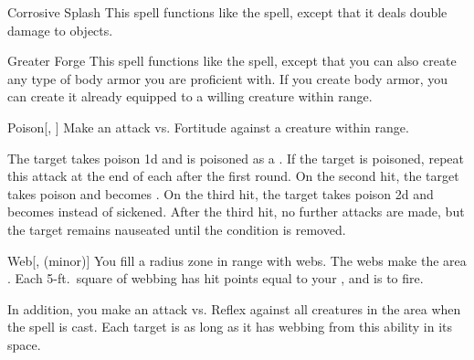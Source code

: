 \lowercase{\hypertarget{spell:Corrosive Splash}{}}\label{spell:Corrosive Splash}
\begin{ability}[\nth{2}]{\hypertarget{spell:Corrosive Splash}{Corrosive Splash}}
This spell functions like the  spell, except that it deals double damage to objects.
\end{ability}
\vspace{0.25em}



\lowercase{\hypertarget{spell:Greater Forge}{}}\label{spell:Greater Forge}
\begin{ability}[\nth{2}]{\hypertarget{spell:Greater Forge}{Greater Forge}}
This spell functions like the  spell, except that you can also create any type of body armor you are proficient with.
If you create body armor, you can create it already equipped to a willing creature within range.
\end{ability}
\vspace{0.25em}



\lowercase{\hypertarget{spell:Poison}{}}\label{spell:Poison}
\begin{ability}[\nth{2}]{\hypertarget{spell:Poison}{Poison}}[, ]
Make an attack vs. Fortitude against a creature within \rngmed range.

\hit The target takes poison  \plus1d and is poisoned as a .
If the target is poisoned, repeat this attack at the end of each  after the first round.
On the second hit, the target takes poison  and becomes .
On the third hit, the target takes poison  \plus2d and becomes  instead of sickened.
After the third hit, no further attacks are made, but the target remains nauseated until the condition is removed.
\end{ability}
\vspace{0.25em}



\lowercase{\hypertarget{spell:Web}{}}\label{spell:Web}
\begin{ability}[\nth{2}]{\hypertarget{spell:Web}{Web}}[,  (minor)]
You fill a \areasmall radius zone in \rngclose range with webs.
The webs make the area .
Each 5-ft.\ square of webbing has hit points equal to your , and is  to fire.

In addition, you make an attack vs. Reflex against all creatures in the area when the spell is cast.
\hit Each target is \immobilized as long as it has webbing from this ability in its space.
\end{ability}
\vspace{0.25em}



